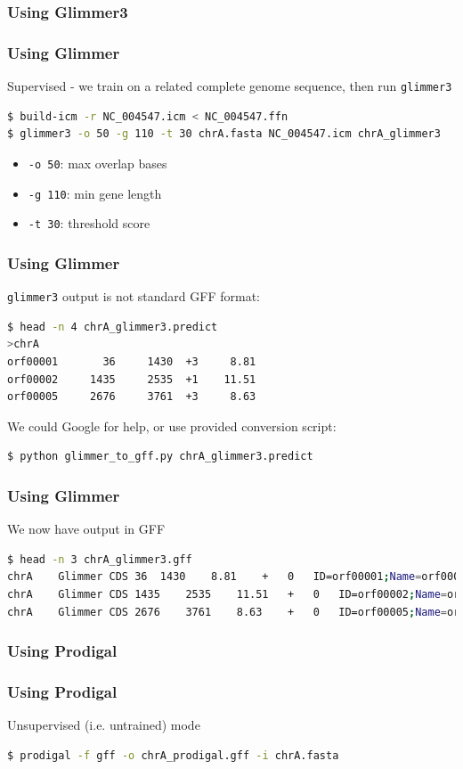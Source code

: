 \subsubsection{Using Glimmer3}
\begin{frame}[fragile]
  \frametitle{Using Glimmer}
  Supervised - we train on a related complete genome sequence, then run \texttt{glimmer3}
\begin{lstlisting}[language=bash]
$ build-icm -r NC_004547.icm < NC_004547.ffn
$ glimmer3 -o 50 -g 110 -t 30 chrA.fasta NC_004547.icm chrA_glimmer3
\end{lstlisting}
 \begin{itemize}
   \item \texttt{-o 50}: max overlap bases
   \item \texttt{-g 110}: min gene length
   \item \texttt{-t 30}:  threshold score
 \end{itemize}
\end{frame}

\begin{frame}[fragile]
  \frametitle{Using Glimmer}
  \texttt{glimmer3} output is not standard GFF format:
\begin{lstlisting}[language=bash]
$ head -n 4 chrA_glimmer3.predict 
>chrA
orf00001       36     1430  +3     8.81
orf00002     1435     2535  +1    11.51
orf00005     2676     3761  +3     8.63
\end{lstlisting}
  We could Google for help, or use provided conversion script:
\begin{lstlisting}[language=bash]
$ python glimmer_to_gff.py chrA_glimmer3.predict
\end{lstlisting}    
\end{frame}

\begin{frame}[fragile]
  \frametitle{Using Glimmer}
  We now have output in GFF
\begin{lstlisting}[language=bash]
$ head -n 3 chrA_glimmer3.gff 
chrA	Glimmer	CDS	36	1430	8.81	+	0	ID=orf00001;Name=orf00001
chrA	Glimmer	CDS	1435	2535	11.51	+	0	ID=orf00002;Name=orf00002
chrA	Glimmer	CDS	2676	3761	8.63	+	0	ID=orf00005;Name=orf00005
\end{lstlisting}
\end{frame}

\subsubsection{Using Prodigal}
\begin{frame}[fragile]
  \frametitle{Using Prodigal}
  Unsupervised (i.e. untrained) mode
\begin{lstlisting}[language=bash]
$ prodigal -f gff -o chrA_prodigal.gff -i chrA.fasta
\end{lstlisting}
\end{frame}

